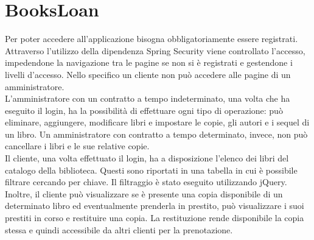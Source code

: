 \documentclass[a4paper,10pt]{article}
\begin{document}
\section*{BooksLoan}
Per poter accedere all’applicazione bisogna obbligatoriamente essere registrati. Attraverso l'utilizzo della dipendenza Spring Security viene controllato l'accesso, impedendone la navigazione tra le pagine se non si è registrati e gestendone i livelli d'accesso. Nello specifico un cliente non può accedere alle pagine di un amministratore.\\

\noindent L'amministratore con un contratto a tempo indeterminato, una volta che ha eseguito il login, ha la possibilità di effettuare ogni tipo di operazione: può eliminare, aggiungere, modificare libri e impostare le copie, gli autori e i sequel di un libro.
Un amministratore con contratto a tempo determinato, invece, non può cancellare i libri e le sue relative copie.\\

\noindent Il cliente, una volta effettuato il login, ha a disposizione l'elenco dei libri del catalogo della biblioteca. Questi sono riportati in una tabella in cui è possibile filtrare cercando per chiave. Il filtraggio è stato eseguito utilizzando jQuery. Inoltre, il cliente può visualizzare se è presente una copia disponibile di un determinato libro ed eventualmente prenderla in prestito, può visualizzare i suoi prestiti in corso e restituire una copia. La restituzione rende disponibile la copia stessa e quindi accessibile da altri clienti per la prenotazione.\\
\end{document}

